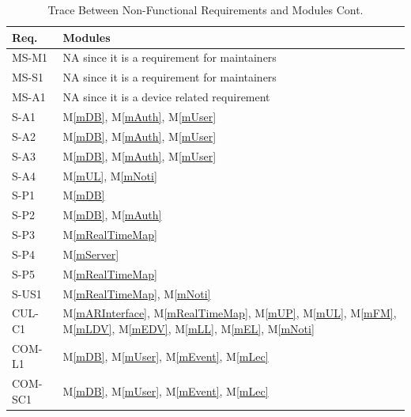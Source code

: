 \documentclass[12pt, titlepage]{article}
\newcommand{\mref}[1]{M\ref{#1}}
\begin{document}
\begin{table}[H]
\centering
\begin{tabular}{p{} p{}}
\toprule
\textbf{Req.} & \textbf{Modules}\\
\midrule
MS-M1 & NA since it is a requirement for maintainers\\
MS-S1 & NA since it is a requirement for maintainers\\
MS-A1 & NA since it is a device related requirement\\
S-A1 & \mref{mDB}, \mref{mAuth}, \mref{mUser}\\
S-A2 & \mref{mDB}, \mref{mAuth}, \mref{mUser}\\
S-A3 & \mref{mDB}, \mref{mAuth}, \mref{mUser}\\
S-A4 & \mref{mUL}, \mref{mNoti}\\
S-P1 & \mref{mDB}\\
S-P2 & \mref{mDB}, \mref{mAuth}\\
S-P3 & \mref{mRealTimeMap}\\
S-P4 & \mref{mServer}\\
S-P5 & \mref{mRealTimeMap}\\
S-US1 & \mref{mRealTimeMap}, \mref{mNoti}\\
CUL-C1 & \mref{mARInterface}, \mref{mRealTimeMap}, \mref{mUP}, \mref{mUL}, \mref{mFM}, \mref{mLDV}, \mref{mEDV}, \mref{mLL}, \mref{mEL}, \mref{mNoti}\\
COM-L1 & \mref{mDB}, \mref{mUser}, \mref{mEvent}, \mref{mLec}\\
COM-SC1 & \mref{mDB}, \mref{mUser}, \mref{mEvent}, \mref{mLec}\\
\bottomrule
\end{tabular}
\caption{Trace Between Non-Functional Requirements and Modules Cont.}
\label{TblNFRT-CONT}
\end{table}
\end{document}
